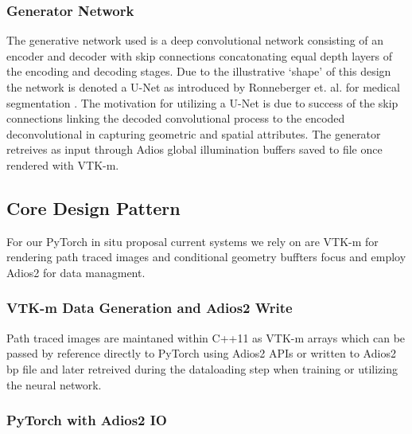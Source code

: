 \documentclass[sigconf,authordraft]{acmart}
\begin{document}
\subsubsection{Generator Network}

The generative network used is a deep convolutional network consisting of an encoder and decoder with skip connections concatonating equal depth layers of the encoding and decoding stages. Due to the illustrative `shape' of this design the network is denoted a U-Net as introduced by Ronneberger et. al. for medical segmentation \cite{ronnebergerUnet}. The motivation for utilizing a U-Net is due to success of the skip connections linking the decoded convolutional process to the encoded deconvolutional in capturing geometric and spatial attributes. The generator retreives as input through Adios global illumination buffers saved to file once rendered with VTK-m. 

\subsection{Core Design Pattern}

For our PyTorch in situ proposal current systems we rely on are VTK-m for rendering path traced images and conditional geometry buffters focus and employ Adios2 for data managment. 

\subsubsection{VTK-m Data Generation and Adios2 Write}

Path traced images are maintaned within C++11 as VTK-m arrays which can be passed by reference directly to PyTorch using Adios2 APIs or written to Adios2 bp file and later retreived during the dataloading step when training or utilizing the neural network. 

\subsubsection{PyTorch with Adios2 IO}
\end{document}
